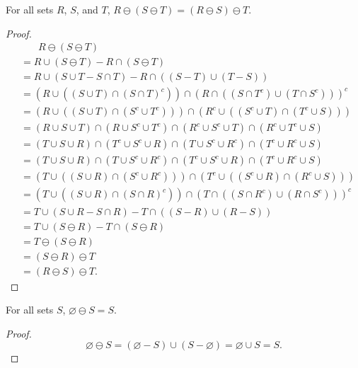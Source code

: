 \documentclass[../math.tex]{subfiles}
\begin{document}
\begin{theorem}
    For all sets $R$, $S$, and $T$, $R \ominus (S \ominus T) = (R \ominus S)
    \ominus T$.
\end{theorem}
\begin{proof}
    \begin{align*}
        &\phantom{=}\ \ R \ominus (S \ominus T) \\
        &= R \cup (S \ominus T) - R \cap (S \ominus T) \\
        &= R \cup (S \cup T - S \cap T) - R \cap ((S - T) \cup (T - S)) \\
        &= (R \cup ((S \cup T) \cap (S \cap T)^c)) \cap
            (R \cap ((S \cap T^c) \cup (T \cap S^c)))^c \\
        &= (R \cup ((S \cup T) \cap (S^c \cup T^c))) \cap
            (R^c \cup ((S^c \cup T) \cap (T^c \cup S))) \\
        &= (R \cup S \cup T) \cap (R \cup S^c \cup T^c) \cap
            (R^c \cup S^c \cup T) \cap (R^c \cup T^c \cup S) \\
        &= (T \cup S \cup R) \cap (T^c \cup S^c \cup R) \cap
            (T \cup S^c \cup R^c) \cap (T^c \cup R^c \cup S) \\
        &= (T \cup S \cup R) \cap (T \cup S^c \cup R^c) \cap
            (T^c \cup S^c \cup R) \cap (T^c \cup R^c \cup S) \\
        &= (T \cup ((S \cup R) \cap (S^c \cup R^c))) \cap
            (T^c \cup ((S^c \cup R) \cap (R^c \cup S))) \\
        &= (T \cup ((S \cup R) \cap (S \cap R)^c)) \cap
            (T \cap ((S \cap R^c) \cup (R \cap S^c)))^c \\
        &= T \cup (S \cup R - S \cap R) - T \cap ((S - R) \cup (R - S)) \\
        &= T \cup (S \ominus R) - T \cap (S \ominus R) \\
        &= T \ominus (S \ominus R) \\
        &= (S \ominus R) \ominus T \\
        &= (R \ominus S) \ominus T.
    \end{align*}
\end{proof}

\begin{theorem}
    For all sets $S$, $\varnothing \ominus S = S$.
\end{theorem}
\begin{proof}
    \[
        \varnothing \ominus S = (\varnothing - S) \cup (S - \varnothing)
        = \varnothing \cup S = S.
    \]
\end{proof}
\end{document}
